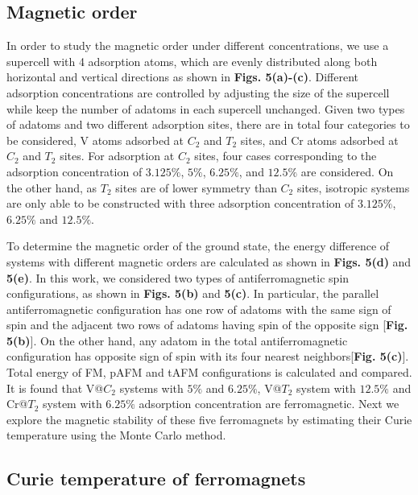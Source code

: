 \documentclass[%
superscriptaddress,
preprint,
showpacs,preprintnumbers,
 amsmath,amssymb,
prb,
]{revtex4-1}
\begin{document}
\subsection{Magnetic order}


In order to study the magnetic order under different concentrations, we
use a supercell with 4 adsorption atoms, which are evenly distributed along both horizontal and vertical directions as shown in \textbf{Figs. 5(a)-(c)}. Different adsorption concentrations are controlled by adjusting the size of the supercell while keep the number of adatoms in each supercell
unchanged. Given two types of adatoms and two different adsorption sites, there are in total four categories to be considered, V atoms adsorbed at $C_{2}$ and $T_{2}$ sites, and Cr atoms adsorbed at $C_{2}$ and $T_{2}$ sites. For adsorption at $C_{2}$ sites, four cases corresponding to the adsorption concentration of $3.125\%$, $5\%$, $6.25\%$, and $12.5\%$ are considered. On the other hand, as $T_{2}$
sites are of lower symmetry than $C_{2}$ sites, isotropic systems are only able to be constructed with three adsorption concentration of $3.125\%$,$6.25\%$ and $12.5\%.$

To determine the magnetic order of the ground state, the energy difference of
systems with different magnetic orders are calculated as shown in \textbf{Figs. 5(d)} and \textbf{5(e)}. In this work, we considered two types of antiferromagnetic spin configurations, as shown in \textbf{Figs. 5(b)} and \textbf{5(c)}. In particular, the parallel antiferromagnetic configuration has one row of adatoms
with the same sign of spin and the adjacent two rows of adatoms
having spin of the opposite sign [\textbf{Fig. 5(b)}]. On the other hand, any
adatom in the total antiferromagnetic configuration has opposite sign
of spin with its four nearest neighbors[\textbf{Fig. 5(c)}]. Total energy of FM, pAFM and tAFM configurations is calculated and compared. It is found that V@$C_{2}$ systems with $5\%$ and $6.25\%$, V@$T_{2}$ system with $12.5\%$ and Cr@$T_{2}$ system with $6.25\%$ adsorption concentration are ferromagnetic. Next we explore the magnetic stability of these five ferromagnets by estimating their Curie temperature using the Monte Carlo method.

\subsection{Curie temperature of ferromagnets}
\end{document}
